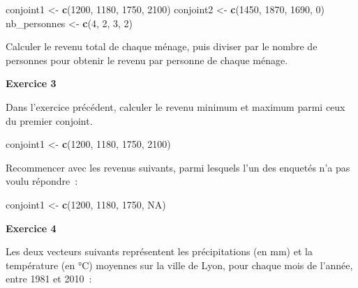\documentclass[12pt,]{book}
\newenvironment{Shaded}{\begin{snugshade}}{\end{snugshade}}
\newcommand{\DecValTok}[1]{\textcolor[rgb]{0.00,0.00,0.81}{#1}}
\newcommand{\KeywordTok}[1]{\textcolor[rgb]{0.13,0.29,0.53}{\textbf{#1}}}
\newcommand{\NormalTok}[1]{#1}
\newcommand{\OtherTok}[1]{\textcolor[rgb]{0.56,0.35,0.01}{#1}}
\newcommand{\StringTok}[1]{\textcolor[rgb]{0.31,0.60,0.02}{#1}}
\begin{document}
\begin{Shaded}
\begin{Highlighting}[]
\NormalTok{conjoint1 <-}\StringTok{ }\KeywordTok{c}\NormalTok{(}\DecValTok{1200}\NormalTok{, }\DecValTok{1180}\NormalTok{, }\DecValTok{1750}\NormalTok{, }\DecValTok{2100}\NormalTok{)}
\NormalTok{conjoint2 <-}\StringTok{ }\KeywordTok{c}\NormalTok{(}\DecValTok{1450}\NormalTok{, }\DecValTok{1870}\NormalTok{, }\DecValTok{1690}\NormalTok{, }\DecValTok{0}\NormalTok{)}
\NormalTok{nb_personnes <-}\StringTok{ }\KeywordTok{c}\NormalTok{(}\DecValTok{4}\NormalTok{, }\DecValTok{2}\NormalTok{, }\DecValTok{3}\NormalTok{, }\DecValTok{2}\NormalTok{)}
\end{Highlighting}
\end{Shaded}

Calculer le revenu total de chaque ménage, puis diviser par le nombre de personnes pour obtenir le revenu par personne de chaque ménage.

\textbf{Exercice 3}

Dans l'exercice précédent, calculer le revenu minimum et maximum parmi ceux du premier conjoint.

\begin{Shaded}
\begin{Highlighting}[]
\NormalTok{conjoint1 <-}\StringTok{ }\KeywordTok{c}\NormalTok{(}\DecValTok{1200}\NormalTok{, }\DecValTok{1180}\NormalTok{, }\DecValTok{1750}\NormalTok{, }\DecValTok{2100}\NormalTok{)}
\end{Highlighting}
\end{Shaded}

Recommencer avec les revenus suivants, parmi lesquels l'un des enquetés n'a pas voulu répondre~:

\begin{Shaded}
\begin{Highlighting}[]
\NormalTok{conjoint1 <-}\StringTok{ }\KeywordTok{c}\NormalTok{(}\DecValTok{1200}\NormalTok{, }\DecValTok{1180}\NormalTok{, }\DecValTok{1750}\NormalTok{, }\OtherTok{NA}\NormalTok{)}
\end{Highlighting}
\end{Shaded}

\textbf{Exercice 4}

Les deux vecteurs suivants représentent les précipitations (en mm) et la température (en °C) moyennes sur la ville de Lyon, pour chaque mois de l'année, entre 1981 et 2010~:
\end{document}
